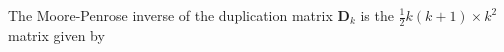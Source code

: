 \noindent The Moore-Penrose inverse of the duplication matrix 
$
\mathbf{D}_{k}
$
is the 
$
\frac{1}{2}
k 
\left( 
k
+
1 
\right)
\times 
k^2
$  
matrix given by
